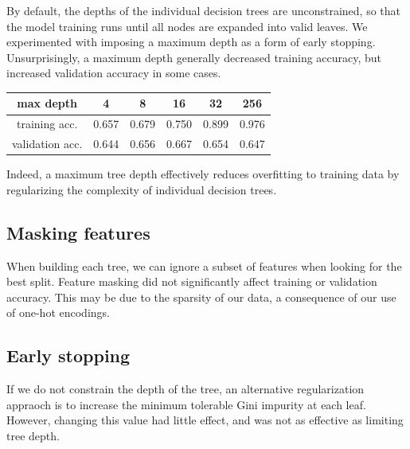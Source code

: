\documentclass{article}
\begin{document}
\begin{multicols}{2}
By default,
the depths of the individual decision trees are unconstrained,
so that the model training runs until all nodes
are expanded into valid leaves.
We experimented with imposing a maximum depth
as a form of early stopping.
Unsurprisingly,
a maximum depth generally decreased training accuracy,
but increased validation accuracy
in some cases.
%
%
%
%
%
\begin{center}
    \begin{tabular}{c|ccccc}
        max depth &
          4 & 8 & 16 & 32 & 256 \\\hline
        training acc. &
          0.657 & 0.679 & 0.750 & 0.899 & 0.976\\
        validation acc. &
          0.644 & 0.656 & 0.667 & 0.654 & 0.647
    \end{tabular}
\end{center}
Indeed, a maximum tree depth effectively
reduces overfitting to training data
by regularizing the complexity of individual decision trees.

\subsection{Masking features}

When building each tree,
we can ignore a subset of features
when looking for the best split.
Feature masking did not significantly affect
training or validation accuracy.
This may be due to the sparsity of our data,
a consequence of our use of one-hot encodings.

\subsection{Early stopping}

If we do not constrain the depth of the tree,
an alternative regularization appraoch
is to increase the minimum tolerable Gini impurity at each leaf.
However,
changing this value had little effect,
and was not as effective as limiting tree depth.


\end{multicols}
\end{document}
